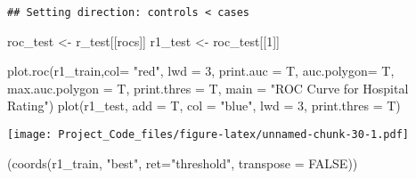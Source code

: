 \documentclass[
]{article}
\newenvironment{Shaded}{\begin{snugshade}}{\end{snugshade}}
\newcommand{\AttributeTok}[1]{\textcolor[rgb]{0.77,0.63,0.00}{#1}}
\newcommand{\ConstantTok}[1]{\textcolor[rgb]{0.00,0.00,0.00}{#1}}
\newcommand{\DecValTok}[1]{\textcolor[rgb]{0.00,0.00,0.81}{#1}}
\newcommand{\FunctionTok}[1]{\textcolor[rgb]{0.00,0.00,0.00}{#1}}
\newcommand{\NormalTok}[1]{#1}
\newcommand{\OtherTok}[1]{\textcolor[rgb]{0.56,0.35,0.01}{#1}}
\newcommand{\SpecialCharTok}[1]{\textcolor[rgb]{0.00,0.00,0.00}{#1}}
\newcommand{\StringTok}[1]{\textcolor[rgb]{0.31,0.60,0.02}{#1}}
\begin{document}
\begin{Shaded}
\end{Shaded}

\begin{verbatim}
## Setting direction: controls < cases
\end{verbatim}

\begin{Shaded}
\begin{Highlighting}[]
\NormalTok{roc\_test }\OtherTok{\textless{}{-}}\NormalTok{ r\_test[[}\StringTok{\textquotesingle{}rocs\textquotesingle{}}\NormalTok{]]}
\NormalTok{r1\_test }\OtherTok{\textless{}{-}}\NormalTok{ roc\_test[[}\DecValTok{1}\NormalTok{]]}
\end{Highlighting}
\end{Shaded}

\begin{Shaded}
\begin{Highlighting}[]
\FunctionTok{plot.roc}\NormalTok{(r1\_train,}\AttributeTok{col=} \StringTok{"red"}\NormalTok{, }\AttributeTok{lwd =} \DecValTok{3}\NormalTok{,}
         \AttributeTok{print.auc =}\NormalTok{ T,}
         \AttributeTok{auc.polygon=}\NormalTok{ T,}
         \AttributeTok{max.auc.polygon =}\NormalTok{ T,}
         \AttributeTok{print.thres =}\NormalTok{ T,}
         \AttributeTok{main =} \StringTok{"ROC Curve for Hospital Rating"}\NormalTok{)}
\FunctionTok{plot}\NormalTok{(r1\_test, }\AttributeTok{add =}\NormalTok{ T, }\AttributeTok{col =} \StringTok{"blue"}\NormalTok{,}
     \AttributeTok{lwd =} \DecValTok{3}\NormalTok{, }\AttributeTok{print.thres =}\NormalTok{ T)}
\end{Highlighting}
\end{Shaded}

\texttt{[image: Project\_Code\_files/figure-latex/unnamed-chunk-30-1.pdf]}

\begin{Shaded}
\begin{Highlighting}[]
\NormalTok{(}\FunctionTok{coords}\NormalTok{(r1\_train, }\StringTok{"best"}\NormalTok{, }\AttributeTok{ret=}\StringTok{"threshold"}\NormalTok{, }\AttributeTok{transpose =} \ConstantTok{FALSE}\NormalTok{))}
\end{Highlighting}
\end{Shaded}
\end{document}
